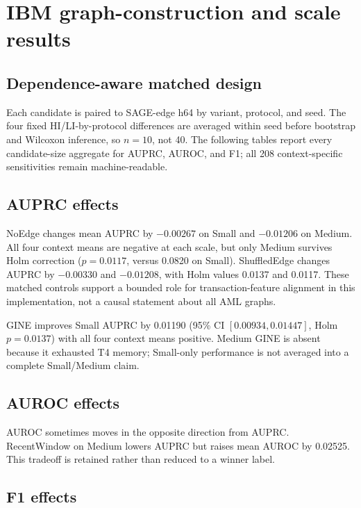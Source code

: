 \section{IBM graph-construction and scale results}
\label{sec:s-ibm-graph-scale}

\subsection{Dependence-aware matched design}

Each candidate is paired to SAGE-edge h64 by variant, protocol, and seed. The four fixed HI/LI-by-protocol differences are averaged within seed before bootstrap and Wilcoxon inference, so \(n=10\), not 40. The following tables report every candidate-size aggregate for AUPRC, AUROC, and F1; all 208 context-specific sensitivities remain machine-readable.

\subsection{AUPRC effects}



NoEdge changes mean AUPRC by \(-0.00267\) on Small and \(-0.01206\) on Medium. All four context means are negative at each scale, but only Medium survives Holm correction (\(p=0.0117\), versus 0.0820 on Small). ShuffledEdge changes AUPRC by \(-0.00330\) and \(-0.01208\), with Holm values 0.0137 and 0.0117. These matched controls support a bounded role for transaction-feature alignment in this implementation, not a causal statement about all AML graphs.

GINE improves Small AUPRC by 0.01190 (95\% CI \([0.00934,0.01447]\), Holm \(p=0.0137\)) with all four context means positive. Medium GINE is absent because it exhausted T4 memory; Small-only performance is not averaged into a complete Small/Medium claim.

\subsection{AUROC effects}



AUROC sometimes moves in the opposite direction from AUPRC. RecentWindow on Medium lowers AUPRC but raises mean AUROC by 0.02525. This tradeoff is retained rather than reduced to a winner label.

\subsection{F1 effects}


